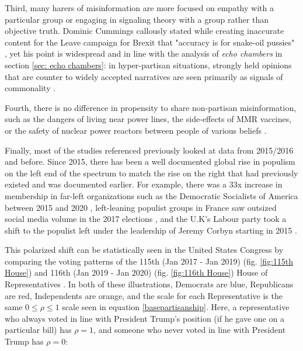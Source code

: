 \documentclass[12pt]{article}
\begin{document}
Third, many harers of misinformation are more focused on empathy with a particular group \cite{winter2015they,rheault2016measuring,dale2017nlp} or engaging in signaling theory with a group \cite{connelly2011signaling,lampe2007familiar,spence2002signaling} rather than objective truth. Dominic Cummings callously stated while creating inaccurate content for the Leave campaign for Brexit that "accuracy is for snake-oil pussies" \cite{crace2016accuracy}, yet his point is widespread and in line with the analysis of \textit{echo chambers} in section \ref{sec: echo chambers}: in hyper-partisan situations, strongly held opinions that are counter to widely accepted narratives are seen primarily as signals of commonality \cite{yla2018populist,noppari2019user,lazer2018science,yla2019politicization,wasilewski2019us,freelon2020russian}. 


Fourth, there is no difference in propensity to share non-partisan misinformation, such as the dangers of living near power lines, the side-effects of MMR vaccines, or the safety of nuclear power reactors between people of various beliefs \cite{kahan2015climate,hara2016co,kahan2012ideology,lewandowsky2016motivated,barbera2015tweeting}.

Finally, most of the studies referenced previously looked at data from 2015/2016 and before. Since 2015, there has been a well documented global rise in populism on the left end of the spectrum to match the rise on the right that had previously existed and was documented earlier. For example, there was a 33x increase in membership in far-left organizations such as the Democratic Socialists of America between 2015 and 2020 \cite{godfrey2020thousands}, left-leaning populist groups in France saw outsized social media volume in the 2017 elections \cite{donadio2017french}, and the U.K's Labour party took a shift to the populist left under the leadership of Jeremy Corbyn starting in 2015 \cite{wainwright2018remarkable,hobson_fielding_2019}. 

This polarized shift can be statistically seen in the United States Congress by comparing the voting patterns of the 115th (Jan 2017 - Jan 2019) (fig. \ref{fig:115th House}) and 116th (Jan 2019 - Jan 2020) (fig. \ref{fig:116th House}) House of Representatives \cite{fivethirtyeight2018tracking}. In both of these illustrations, Democrats are blue, Republicans are red, Independents are orange, and the scale for each Representative is the same $0\leq \rho \leq 1$ scale seen in equation \ref{basepartisanship}. Here, a representative who always voted in line with President Trump's position (if he gave one on a particular bill) has $\rho = 1$, and someone who never voted in line with President Trump has $\rho = 0$:
\end{document}
